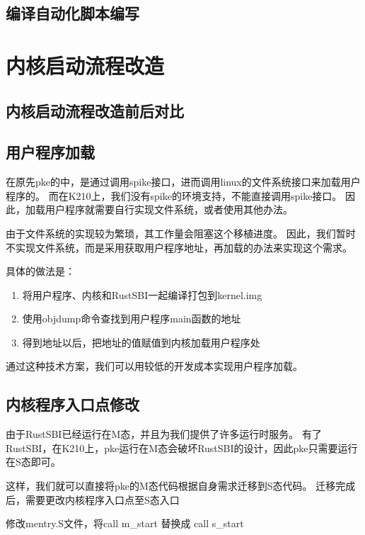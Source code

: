 \subsection{编译自动化脚本编写}

\section{内核启动流程改造}

\subsection{内核启动流程改造前后对比}

\subsection{用户程序加载}

在原先pke的中，是通过调用spike接口，进而调用linux的文件系统接口来加载用户程序的。
而在K210上，我们没有spike的环境支持，不能直接调用spike接口。
因此，加载用户程序就需要自行实现文件系统，或者使用其他办法。

由于文件系统的实现较为繁琐，其工作量会阻塞这个移植进度。
因此，我们暂时不实现文件系统，而是采用获取用户程序地址，再加载的办法来实现这个需求。

具体的做法是：

\begin{enumerate}
    \item 将用户程序、内核和RustSBI一起编译打包到kernel.img
    \item 使用objdump命令查找到用户程序main函数的地址
    \item 得到地址以后，把地址的值赋值到内核加载用户程序处
\end{enumerate}

通过这种技术方案，我们可以用较低的开发成本实现用户程序加载。

\subsection{内核程序入口点修改}

由于RustSBI已经运行在M态，并且为我们提供了许多运行时服务。
有了RustSBI，在K210上，pke运行在M态会破坏RustSBI的设计，因此pke只需要运行在S态即可。

这样，我们就可以直接将pke的M态代码根据自身需求迁移到S态代码。
迁移完成后，需要更改内核程序入口点至S态入口

修改mentry.S文件，将call m\_start 替换成 call s\_start

